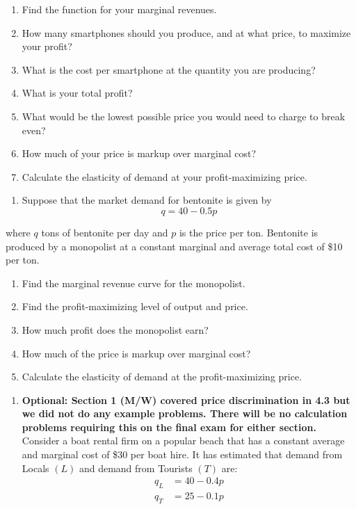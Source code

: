 \documentclass[
  11pt,
]{article}
\providecommand{\tightlist}{%
  \setlength{\itemsep}{0pt}\setlength{\parskip}{0pt}}
\begin{document}
\begin{enumerate}
\def\labelenumi{\alph{enumi}.}
\tightlist
\item
  Find the function for your marginal revenues.
\item
  How many smartphones should you produce, and at what price, to
  maximize your profit?
\item
  What is the cost per smartphone at the quantity you are producing?
\item
  What is your total profit?
\item
  What would be the lowest possible price you would need to charge to
  break even?
\item
  How much of your price is markup over marginal cost?
\item
  Calculate the elasticity of demand at your profit-maximizing price.
\end{enumerate}

\clearpage

\begin{enumerate}
\def\labelenumi{\arabic{enumi}.}
\setcounter{enumi}{8}
\tightlist
\item
  Suppose that the market demand for bentonite is given by
  \[q = 40 - 0.5p\]
\end{enumerate}

where \(q\) tons of bentonite per day and \(p\) is the price per ton.
Bentonite is produced by a monopolist at a constant marginal and average
total cost of \$10 per ton.

\begin{enumerate}
\def\labelenumi{\alph{enumi}.}
\tightlist
\item
  Find the marginal revenue curve for the monopolist.
\item
  Find the profit-maximizing level of output and price.
\item
  How much profit does the monopolist earn?
\item
  How much of the price is markup over marginal cost?
\item
  Calculate the elasticity of demand at the profit-maximizing price.
\end{enumerate}

\clearpage

\begin{enumerate}
\def\labelenumi{\arabic{enumi}.}
\setcounter{enumi}{9}
\tightlist
\item
  \textbf{Optional: Section 1 (M/W) covered price discrimination in 4.3
  but we did not do any example problems. There will be no calculation
  problems requiring this on the final exam for either section.}
  Consider a boat rental firm on a popular beach that has a constant
  average and marginal cost of \$30 per boat hire. It has estimated that
  demand from Locals \((L)\) and demand from Tourists \((T)\) are:
  \[\begin{aligned}
  q_L&=40-0.4p\\
  q_T&=25-0.1p\\
  \end{aligned}\]
\end{enumerate}
\end{document}
